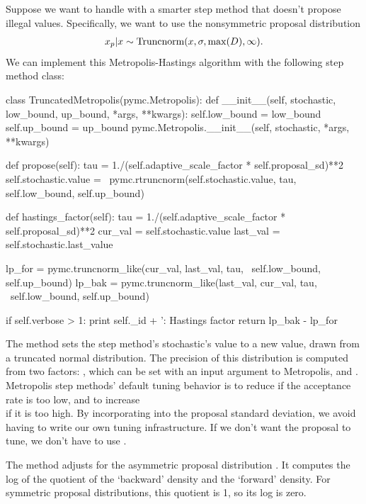 \documentclass[]{jss}
\begin{document}
\medskip
Suppose we want to handle  with a smarter step method that doesn't propose illegal values. Specifically, we want to use the nonsymmetric proposal distribution
\begin{eqnarray*}
  x_p | x \sim \textup{Truncnorm}(x, \sigma, \max(D), \infty).
\end{eqnarray*}
We can implement this Metropolis-Hastings algorithm with the following step method class:
\begin{CodeInput}
class TruncatedMetropolis(pymc.Metropolis):
def __init__(self, stochastic, low_bound, up_bound, *args, **kwargs):
    self.low_bound = low_bound
    self.up_bound = up_bound
    pymc.Metropolis.__init__(self, stochastic, *args, **kwargs)

def propose(self):
    tau = 1./(self.adaptive_scale_factor * self.proposal_sd)**2
    self.stochastic.value = \
        pymc.rtruncnorm(self.stochastic.value, tau, self.low_bound, self.up_bound)

def hastings_factor(self):
    tau = 1./(self.adaptive_scale_factor * self.proposal_sd)**2
    cur_val = self.stochastic.value
    last_val = self.stochastic.last_value

    lp_for = pymc.truncnorm_like(cur_val, last_val, tau, \
        self.low_bound, self.up_bound)
    lp_bak = pymc.truncnorm_like(last_val, cur_val, tau, \
        self.low_bound, self.up_bound)

    if self.verbose > 1:
        print self._id + ': Hastings factor %
    return lp_bak - lp_for
\end{CodeInput}

The  method sets the step method's stochastic's value to a new value, drawn from a truncated normal distribution. The precision of this distribution is computed from two factors: , which can be set with an input argument to Metropolis, and . Metropolis step methods' default tuning behavior is to reduce  if the acceptance rate is too low, and to increase \\ if it is too high. By incorporating  into the proposal standard deviation, we avoid having to write our own tuning infrastructure. If we don't want the proposal to tune, we don't have to use .

The  method adjusts for the asymmetric proposal distribution \citep{gelman}. It computes the log of the quotient of the `backward' density and the `forward' density. For symmetric proposal distributions, this quotient is 1, so its log is zero. 
\end{document}
